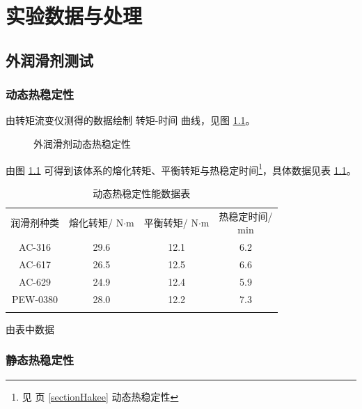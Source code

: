 \chapter{实验数据与处理}

\section{外润滑剂测试}

\subsection{动态热稳定性}
由转矩流变仪测得的数据绘制 转矩-时间 曲线，见图 \ref{fig1Hakee}。

\begin{figure}[H]
    \begin{center}
        
    \end{center}
    \caption{外润滑剂动态热稳定性}
    \label{fig1Hakee}
\end{figure}

由图 \ref{fig1Hakee} 可得到该体系的熔化转矩、平衡转矩与热稳定时间\footnote{见 \pageref{sectionHakee} 页 \ref{sectionHakee} 动态热稳定性}，具体数据见表 \ref{tab1Hakee}。

\begin{table}[!htbp]
    \caption{动态热稳定性能数据表}
    \label{tab1Hakee}
    \begin{center}
    \footnotesize{
        \begin{tabular}{cccc}
            \Xhline{1pt}
            润滑剂种类 & \makecell[c]{熔化转矩/\\N$\cdot$m} & \makecell[c]{平衡转矩/\\N$\cdot$m} & \makecell[c]{热稳定时间/\\min} \\
            \Xhline{0.5pt}
            AC-316 & 29.6 & 12.1 & 6.2  \\
            AC-617 & 26.5 & 12.5 & 6.6  \\
            AC-629 & 24.9 & 12.4 & 5.9  \\
            PEW-0380 & 28.0 & 12.2 & 7.3    \\
            \Xhline{1pt}
        \end{tabular}
    }
    \end{center}
\end{table}

由表中数据

\subsection{静态热稳定性}

